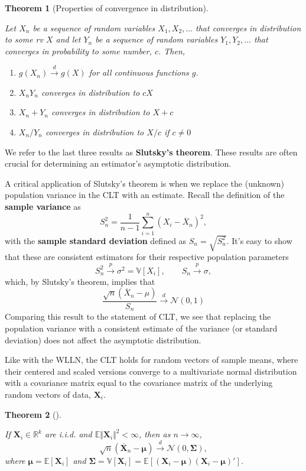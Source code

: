 \documentclass[
  13pt,
  letterpaper,
  DIV=11,
  numbers=noendperiod]{scrreprt}
\providecommand{\tightlist}{%
  \setlength{\itemsep}{0pt}\setlength{\parskip}{0pt}}\usepackage{longtable,booktabs,array}
\newcommand{\mb}{\symbf}
\newcommand{\E}{\mathbb{E}}
\newcommand{\V}{\mathbb{V}}
\newcommand{\N}{\mathcal{N}}
\newcommand{\Xbar}{\overline{X}}
\newcommand{\X}{\mb{X}}
\newcommand{\inprob}{\overset{p}{\to}}
\newcommand{\indist}{\overset{d}{\to}}
\theoremstyle{definition}
\theoremstyle{definition}
\theoremstyle{plain}
\newtheorem{theorem}{Theorem}[chapter]
\theoremstyle{remark}
\begin{document}
\begin{theorem}[Properties of convergence in
distribution]\protect\hypertarget{thm-indist-properties}{}\label{thm-indist-properties}

Let \(X_n\) be a sequence of random variables \(X_1, X_2,\ldots\) that
converges in distribution to some rv \(X\) and let \(Y_n\) be a sequence
of random variables \(Y_1, Y_2,\ldots\) that converges in probability to
some number, \(c\). Then,

\begin{enumerate}
\def\labelenumi{\arabic{enumi}.}
\tightlist
\item
  \(g(X_n) \indist g(X)\) for all continuous functions \(g\).
\item
  \(X_nY_n\) converges in distribution to \(cX\)
\item
  \(X_n + Y_n\) converges in distribution to \(X + c\)
\item
  \(X_n / Y_n\) converges in distribution to \(X / c\) if \(c \neq 0\)
\end{enumerate}

\end{theorem}

We refer to the last three results as \textbf{Slutsky's theorem}. These
results are often crucial for determining an estimator's asymptotic
distribution.

A critical application of Slutsky's theorem is when we replace the
(unknown) population variance in the CLT with an estimate. Recall the
definition of the \textbf{sample variance} as \[
S_n^2 = \frac{1}{n-1} \sum_{i=1}^n (X_i - \Xbar_n)^2,
\] with the \textbf{sample standard deviation} defined as
\(S_{n} = \sqrt{S_{n}^2}\). It's easy to show that these are consistent
estimators for their respective population parameters \[ 
S_{n}^2 \inprob \sigma^2 = \V[X_i], \qquad S_{n} \inprob \sigma,
\] which, by Slutsky's theorem, implies that \[
\frac{\sqrt{n}\left(\Xbar_n - \mu\right)}{S_n} \indist \N(0, 1)
\] Comparing this result to the statement of CLT, we see that replacing
the population variance with a consistent estimate of the variance (or
standard deviation) does not affect the asymptotic distribution.

Like with the WLLN, the CLT holds for random vectors of sample means,
where their centered and scaled versions converge to a multivariate
normal distribution with a covariance matrix equal to the covariance
matrix of the underlying random vectors of data, \(\X_i\).

\begin{theorem}[]\protect\hypertarget{thm-multivariate-clt}{}\label{thm-multivariate-clt}

If \(\mb{X}_i \in \mathbb{R}^k\) are i.i.d. and
\(\E\Vert \mb{X}_i \Vert^2 < \infty\), then as \(n \to \infty\), \[
\sqrt{n}\left( \overline{\mb{X}}_n - \mb{\mu}\right) \indist \N(0, \mb{\Sigma}),
\] where \(\mb{\mu} = \E[\mb{X}_i]\) and
\(\mb{\Sigma} = \V[\mb{X}_i] = \E\left[(\mb{X}_i-\mb{\mu})(\mb{X}_i - \mb{\mu})'\right]\).

\end{theorem}
\end{document}
